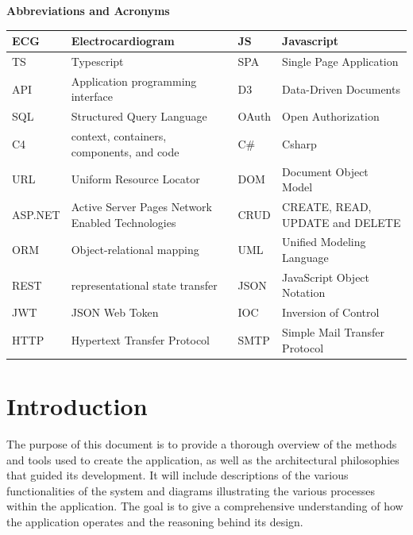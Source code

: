 \documentclass[singlespacing,12pt,parskip,headsepline,consistentlayout]{article}
\begin{document}
\pagebreak
\tableofcontents
\pagebreak
\listoffigures
\listoftables
\pagebreak

\begin{titlepage}
\begin{center}
    {\large\bfseries Abbreviations and Acronyms}
\end{center}


\begin{center}
    \begin{tabular}{ |p{1.75cm}|p{4.5cm}|  |p{1.75cm}|p{4.5cm}|}
    \hline
 ECG & Electrocardiogram & JS & Javascript \\
 \hline
 TS & Typescript & SPA & Single Page Application \\
 \hline

 API & Application programming interface &  D3 & Data-Driven Documents \\
 
 \hline
 SQL & Structured Query Language & OAuth & Open Authorization \\
 
 \hline
 C4 & context, containers, components, and code & C\# & Csharp \\
 \hline
 
 URL & Uniform Resource Locator & DOM & Document Object Model \\
 \hline
  ASP.NET & Active Server Pages Network Enabled Technologies & CRUD & CREATE, READ, UPDATE and DELETE\\
\hline
ORM & Object-relational mapping & UML & Unified Modeling Language\\
\hline
REST & representational state transfer & JSON & JavaScript Object Notation\\
\hline
JWT & JSON Web Token & IOC & Inversion of Control \\
\hline
HTTP & Hypertext Transfer Protocol & SMTP & Simple Mail Transfer Protocol\\
\hline
\end{tabular}
\end{center}
\end{titlepage}


\pagebreak
\section{Introduction}
The purpose of this document is to provide a thorough overview of the methods and tools used to create the application, as well as the architectural philosophies that guided its development. It will include descriptions of the various functionalities of the system and diagrams illustrating the various processes within the application. The goal is to give a comprehensive understanding of how the application operates and the reasoning behind its design.
\end{document}
